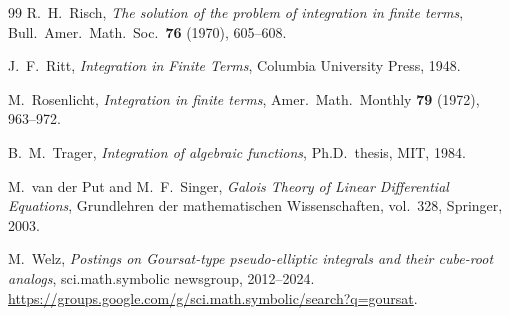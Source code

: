 \documentclass[11pt,a4paper]{article}
\theoremstyle{plain}
\theoremstyle{definition}
\theoremstyle{remark}
\begin{document}
\begin{thebibliography}{99}
R.~H.~Risch,
\emph{The solution of the problem of integration in finite terms},
Bull.\ Amer.\ Math.\ Soc.\ \textbf{76} (1970), 605--608.

J.~F.~Ritt,
\emph{Integration in Finite Terms},
Columbia University Press, 1948.

M.~Rosenlicht,
\emph{Integration in finite terms},
Amer.\ Math.\ Monthly \textbf{79} (1972), 963--972.

B.~M.~Trager,
\emph{Integration of algebraic functions},
Ph.D.\ thesis, MIT, 1984.

M.~van der Put and M.~F.~Singer,
\emph{Galois Theory of Linear Differential Equations},
Grundlehren der mathematischen Wissenschaften, vol.~328, Springer, 2003.

M.~Welz,
\emph{Postings on Goursat-type pseudo-elliptic integrals and their cube-root analogs}, sci.math.symbolic newsgroup, 2012--2024.\\
\url{https://groups.google.com/g/sci.math.symbolic/search?q=goursat}.

\end{thebibliography}
\end{document}
